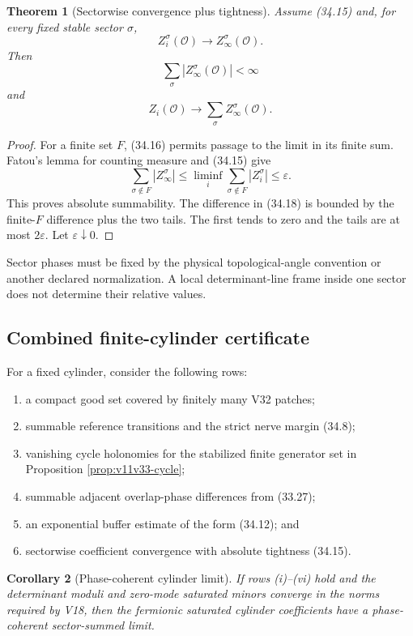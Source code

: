 \documentclass[11pt]{article}
\newtheorem{theorem}{Theorem}[section]
\newtheorem{corollary}[theorem]{Corollary}
\begin{document}
\begin{theorem}[Sectorwise convergence plus tightness]
\label{thm:v11v34-sector-tightness}
Assume (34.15) and, for every fixed stable sector \(\sigma\),
\[
 Z_i^\sigma(\mathcal O)\longrightarrow
 Z_\infty^\sigma(\mathcal O).
 \tag{34.16}
\]
Then
\[
 \sum_\sigma|Z_\infty^\sigma(\mathcal O)|<\infty
 \tag{34.17}
\]
and
\[
 Z_i(\mathcal O)\longrightarrow
 \sum_\sigma Z_\infty^\sigma(\mathcal O).
 \tag{34.18}
\]
\end{theorem}

\begin{proof}
For a finite set \(F\), (34.16) permits passage to the limit in its
finite sum.  Fatou's lemma for counting measure and (34.15) give
\[
 \sum_{\sigma\notin F}|Z_\infty^\sigma|
 \leq
 \liminf_i\sum_{\sigma\notin F}|Z_i^\sigma|
 \leq\varepsilon.
\]
This proves absolute summability.  The difference in (34.18) is bounded
by the finite-\(F\) difference plus the two tails.  The first tends to
zero and the tails are at most \(2\varepsilon\).  Let
\(\varepsilon\downarrow0\).
\end{proof}

Sector phases must be fixed by the physical topological-angle convention
or another declared normalization.  A local determinant-line frame
inside one sector does not determine their relative values.

\subsection{Combined finite-cylinder certificate}

For a fixed cylinder, consider the following rows:
\begin{enumerate}[label=\textnormal{(\roman*)}]
\item a compact good set covered by finitely many V32 patches;
\item summable reference transitions and the strict nerve margin
(34.8);
\item vanishing cycle holonomies for the stabilized finite generator
set in Proposition \ref{prop:v11v33-cycle};
\item summable adjacent overlap-phase differences from (33.27);
\item an exponential buffer estimate of the form (34.12); and
\item sectorwise coefficient convergence with absolute tightness
(34.15).
\end{enumerate}

\begin{corollary}[Phase-coherent cylinder limit]
\label{cor:v11v34-cylinder-limit}
If rows (i)--(vi) hold and the determinant moduli and zero-mode
saturated minors converge in the norms required by V18, then the
fermionic saturated cylinder coefficients have a phase-coherent
sector-summed limit.
\end{corollary}
\end{document}
